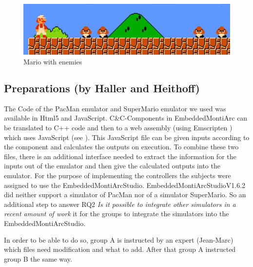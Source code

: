 \begin{figure}[!h]
	\centering
	\includegraphics[scale=0.55]{pictures/Mario4.PNG}
	\caption{Mario with enemies}
	\label{fig:marioFight}
\end{figure}

\subsection{Preparations (by Haller and Heithoff)}
The Code of the PacMan emulator \cite{pacmanLink} and SuperMario emulator \cite{marioLink} we used was available in Html5 and JavaScript. C\&C-Components in EmbeddedMontiArc can be translated to C++ code and then to a web assembly (using Emscripten \cite{emscirpten}) which uses JavaScript (see \cite{bertram2017component}). This JavaScript file can be given inputs according to the component and calculates the outputs on execution. To combine these two files, there is an additional interface needed to extract the information for the inputs out of the emulator and then give the calculated outputs into the emulator.
For the purpose of implementing the controllers the subjects were assigned to use the EmbeddedMontiArcStudio.
EmbeddedMontiArcStudioV1.6.2 did neither support a simulator of PacMan nor of a simulator SuperMario. So an additional step to answer RQ2 \textit{Is it possible to integrate other simulators in a recent amount of work} it for the groups to integrate the simulators into the EmbeddedMontiArcStudio.

In order to be able to do so, group A is instructed by an expert (Jean-Marc) which files need modification and what to add. After that group A instructed group B the same way.

